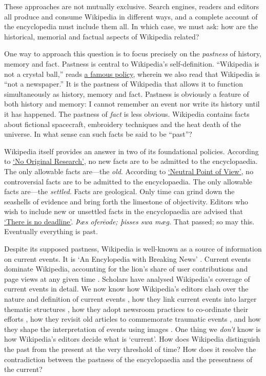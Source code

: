 \documentclass[
  Crown,
  times,
  sageh]{sagej}
\begin{document}
These approaches are not mutually exclusive. Search engines, readers and
editors all produce and consume Wikipedia in different ways, and a
complete account of the encyclopedia must include them all. In which
case, we must ask: how are the historical, memorial and factual aspects
of Wikipedia related?

One way to approach this question is to focus precisely on the
\emph{pastness} of history, memory and fact. Pastness is central to
Wikipedia's self-definition. ``Wikipedia is not a crystal ball,'' reads
\href{https://en.wikipedia.org/wiki/WP:NOT}{a famous policy}, wherein we
also read that Wikipedia is ``not a newspaper.'' It is the pastness of
Wikipedia that allows it to function simultaneously as history, memory
and fact. Pastness is obviously a feature of both history and memory: I
cannot remember an event nor write its history until it has happened.
The pastness of \emph{fact} is less obvious. Wikipedia contains facts
about fictional spacecraft, embroidery techniques and the heat death of
the universe. In what sense can such facts be said to be ``past''?

Wikipedia itself provides an answer in two of its foundational policies.
According to
\href{https://en.wikipedia.org/wiki/Wikipedia:No_original_research}{`No
Original Research'}, no new facts are to be admitted to the
encyclopaedia. The only allowable facts are---the \emph{old}. According
to
\href{https://en.wikipedia.org/wiki/Wikipedia:Neutral_point_of_view}{`Neutral
Point of View'}, no controversial facts are to be admitted to the
encyclopaedia. The only allowable facts are---the \emph{settled}. Facts
are geological. Only time can grind down the seashells of evidence and
bring forth the limestone of objectivity. Editors who wish to include
new or unsettled facts in the encyclopaedia are advised that
\href{https://en.wikipedia.org/wiki/Wikipedia:There_is_no_deadline}{`There
is no deadline'}. \emph{Þæs oferēode; þisses swa mæg.} That passed; so
may this. Eventually everything is past.

Despite its supposed pastness, Wikipedia is well-known as a source of
information on current events. It is `An Encylopedia with Breaking News'
\citep{keegan_encyclopedia_2019}. Current events dominate Wikipedia,
accounting for the lion's share of user contributions and page views at
any given time \citep{keegan_hot_2011}. Scholars have analysed
Wikipedia's coverage of current events in detail. We now know how
Wikipedia's editors clash over the nature and definition of current
events \citep{ford_writing_2022, pentzold_fixing_2009}, how they link
current events into larger thematic structures
\citep{twyman_black_2017}, how they adopt newsroom practices to
co-ordinate their efforts \citep{avieson_breaking_2019}, how they
revisit old articles to commemorate traumatic events
\citep{ferron_beyond_2014}, and how they shape the interpretation of
events using images \citep{porter_visual_2020}. One thing we
\emph{don't} know is how Wikipedia's editors decide what is `current'.
How does Wikipedia distinguish the past from the present at the very
threshold of time? How does it resolve the contradiction between the
pastness of the encyclopaedia and the presentness of the current?
\end{document}

